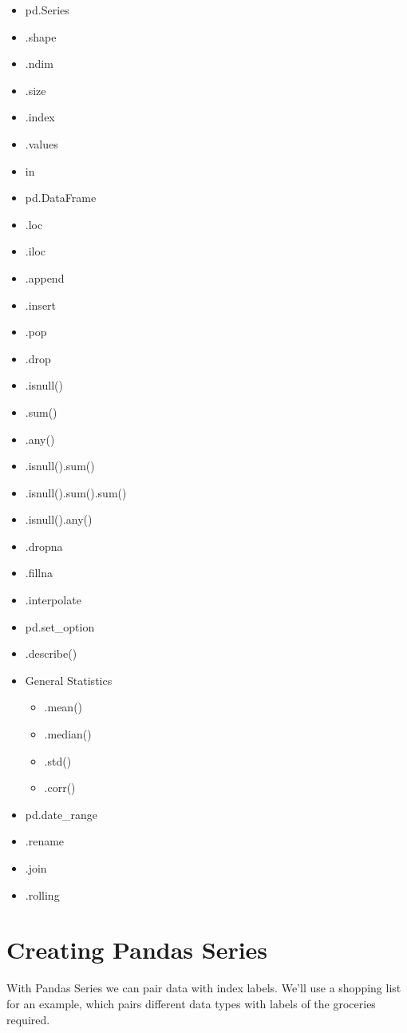 \documentclass{article}
\begin{document}
\begin{itemize}
	\item pd.Series
	\item .shape
	\item .ndim
	\item .size
	\item .index
	\item .values
	\item in
	\item pd.DataFrame
	\item .loc
	\item .iloc
	\item .append
	\item .insert
	\item .pop
	\item .drop
	\item .isnull()
	\item .sum()
	\item .any()
	\item .isnull().sum()
	\item .isnull().sum().sum()
	\item .isnull().any()
	\item .dropna
	\item .fillna
	\item .interpolate
	\item pd.set\_option
	\item .describe()
	\item General Statistics
	
	\begin{itemize}
		\item .mean()
		\item .median()
		\item .std()
		\item .corr()
	\end{itemize}
	
	\item pd.date\_range
	\item .rename
	\item .join
	\item .rolling
\end{itemize}


\section{Creating Pandas Series}\label{sec:concept1}
With Pandas Series we can pair data with index labels. We'll use a shopping list for an example, which pairs different data types with labels of the groceries required. 
\end{document}
